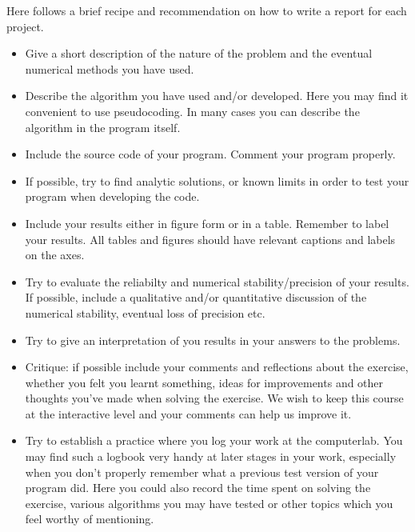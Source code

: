 \documentclass[11pt,a4wide]{article}
\begin{document}
Here follows a brief recipe and recommendation on how to write a report for each
project.
\begin{itemize}
\item Give a short description of the nature of the problem and the eventual 
numerical methods you have used.
\item Describe the algorithm you have used and/or developed. Here you may find it convenient
to use pseudocoding. In many cases you can describe the algorithm
in the program itself.

\item Include the source code of your program. Comment your program properly.
\item If possible, try to find analytic solutions, or known limits
in order to test your program when developing the code.
\item Include your results either in figure form or in a table. Remember to
       label your results. All tables and figures should have relevant captions
       and labels on the axes.
\item Try to evaluate the reliabilty and numerical stability/precision
of your results. If possible, include a qualitative and/or quantitative
discussion of the numerical stability, eventual loss of precision etc. 

\item Try to give an interpretation of you results in your answers to 
the problems.
\item Critique: if possible include your comments and reflections about the 
exercise, whether you felt you learnt something, ideas for improvements and 
other thoughts you've made when solving the exercise.
We wish to keep this course at the interactive level and your comments can help
us improve it.
\item Try to establish a practice where you log your work at the 
computerlab. You may find such a logbook very handy at later stages
in your work, especially when you don't properly remember 
what a previous test version 
of your program did. Here you could also record 
the time spent on solving the exercise, various algorithms you may have tested
or other topics which you feel worthy of mentioning.
\end{itemize}
\end{document}
